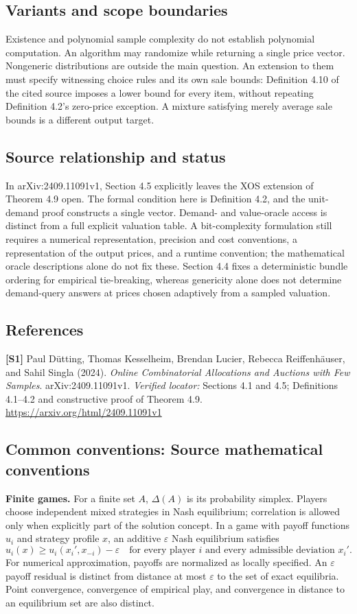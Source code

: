 \documentclass[11pt,a4paper]{article}
\begin{document}
\subsection*{Variants and scope boundaries}
Existence and polynomial sample complexity do not establish polynomial computation. An algorithm may randomize while returning a single price vector. Nongeneric distributions are outside the main question. An extension to them must specify witnessing choice rules and its own sale bounds: Definition 4.10 of the cited source imposes a lower bound for every item, without repeating Definition 4.2's zero-price exception. A mixture satisfying merely average sale bounds is a different output target.
\subsection*{Source relationship and status}
In arXiv:2409.11091v1, Section 4.5 explicitly leaves the XOS extension of Theorem 4.9 open. The formal condition here is Definition 4.2, and the unit-demand proof constructs a single vector. Demand- and value-oracle access is distinct from a full explicit valuation table. A bit-complexity formulation still requires a numerical representation, precision and cost conventions, a representation of the output prices, and a runtime convention; the mathematical oracle descriptions alone do not fix these. Section 4.4 fixes a deterministic bundle ordering for empirical tie-breaking, whereas genericity alone does not determine demand-query answers at prices chosen adaptively from a sampled valuation.
\subsection*{References}
\begingroup\footnotesize\raggedright
\textbf{[S1]} Paul D\"utting, Thomas Kesselheim, Brendan Lucier, Rebecca Reiffenhäuser, and Sahil Singla (2024). \emph{Online Combinatorial Allocations and Auctions with Few Samples}. arXiv:2409.11091v1. \textit{Verified locator:} Sections 4.1 and 4.5; Definitions 4.1--4.2 and constructive proof of Theorem 4.9. \url{https://arxiv.org/html/2409.11091v1}
\par\endgroup

\subsection*{Common conventions: Source mathematical conventions}

\textbf{Finite games.} For a finite set $A$, $\Delta(A)$ is its probability
simplex. Players choose independent mixed strategies in Nash equilibrium;
correlation is allowed only when explicitly part of the solution concept.
In a game with payoff functions $u_i$ and strategy profile $x$, an additive
$\varepsilon$ Nash equilibrium satisfies
\[
 u_i(x)\geq u_i(x_i',x_{-i})-\varepsilon
 \quad\text{for every player $i$ and every admissible deviation $x_i'$}.
\]
For numerical approximation, payoffs are normalized as locally specified.
An $\varepsilon$ payoff residual is distinct from distance at most
$\varepsilon$ to the set of exact equilibria. Point convergence, convergence
of empirical play, and convergence in distance to an equilibrium set are
also distinct.
\end{document}
